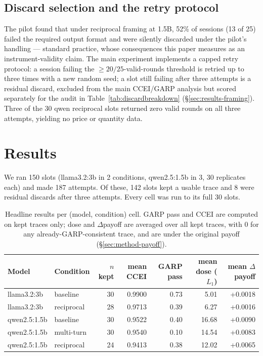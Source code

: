 \documentclass{article}
\begin{document}
\subsection{Discard selection and the retry protocol}
\label{sec:discard}

The pilot found that under reciprocal framing at 1.5B, 52\% of sessions (13 of 25) failed the
required output format and were silently discarded under the pilot's handling --- standard
practice, whose consequences this paper measures as an instrument-validity claim. The main
experiment implements a capped retry protocol: a session failing the $\ge20/25$-valid-rounds
threshold is retried up to three times with a new random seed; a slot still failing after three
attempts is a residual discard, excluded from the main CCEI/GARP analysis but scored separately
for the audit in Table~\ref{tab:discardbreakdown} (\S\ref{sec:results-framing}). Three of the 30
qwen reciprocal slots returned zero valid rounds on all three attempts, yielding no price or
quantity data.

\section{Results}
\label{sec:results}

We ran 150 slots (llama3.2:3b in 2 conditions, qwen2.5:1.5b in 3, 30 replicates each)
and made 187 attempts. Of these, 142 slots kept a usable trace and 8 were residual discards after
three attempts. Every cell was run to its full 30 slots.

\begin{table}[t]
\caption{Headline results per (model, condition) cell. GARP pass and CCEI are computed on kept
traces only; dose and $\Delta$payoff are averaged over all kept traces, with $0$ for any
already-GARP-consistent trace, and are under the original payoff (\S\ref{sec:method-payoff}).}
\label{tab:headline}
\centering
\footnotesize
\begin{tabular}{llrrrrr}
\toprule
Model & Condition & $n$ kept & mean CCEI & GARP pass & mean dose ($L_1$) & mean $\Delta$payoff \\
\midrule
llama3.2:3b  & baseline   & 30 & 0.9900 & 0.73 & 5.01  & +0.0018 \\
llama3.2:3b  & reciprocal & 28 & 0.9713 & 0.39 & 6.27  & +0.0016 \\
qwen2.5:1.5b & baseline   & 30 & 0.9522 & 0.40 & 16.68 & +0.0090 \\
qwen2.5:1.5b & multi-turn & 30 & 0.9540 & 0.10 & 14.54 & +0.0083 \\
qwen2.5:1.5b & reciprocal & 24 & 0.9413 & 0.38 & 12.02 & +0.0065 \\
\bottomrule
\end{tabular}
\end{table}
\end{document}
